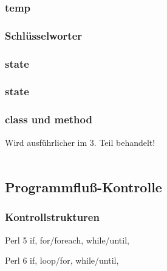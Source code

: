 \begin{frame}
	\frametitle{temp}
	
\end{frame}
% 	

\begin{frame}
	\frametitle{Schlüsselworter}
	
\end{frame}

\begin{frame}
	\frametitle{state}
	
\end{frame}
\begin{frame}
	\frametitle{state}
	
\end{frame}
\begin{frame}
	\frametitle{class und method}
	Wird ausführlicher im 3. Teil behandelt!
	\ \\
	\ \\
	
\end{frame}




\subsection{Programmfluß-Kontrolle}
\begin{frame}
	\frametitle{Kontrollstrukturen}
	
	\begin{block}{Perl 5}
	if, for/foreach, while/until, \textellipsis
	\end{block}
	\begin{block}{Perl 6}
	if, loop/for, while/until, \textellipsis
	\end{block}
\end{frame}

%  	

